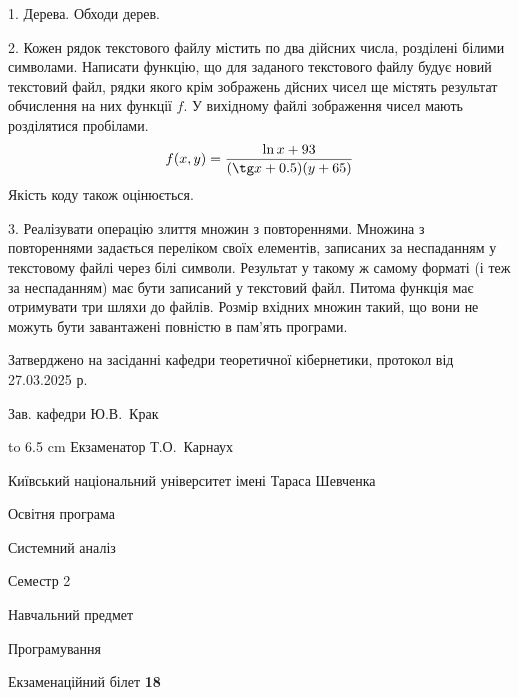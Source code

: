 \documentclass[12pt, ukrainian]{article}
\begin{document}
{%
1. Дерева. Обходи дерев.%
\par
\vspace{2mm}

2. Кожен рядок текстового файлу містить по два дійсних числа, розділені білими символами.
Написати функцію, що для заданого текстового файлу будує новий текстовий файл, рядки якого крім зображень дйсних чисел ще містять результат обчислення на них функції $f$. У вихідному файлі зображення чисел мають розділятися пробілами. 
$$f(x, y) =\frac{\ln x + 93}{(\tg x + 0.5) (y + 65)}$$ 
Якість коду також оцінюється.

\par
\vspace{2mm}

3. Реалізувати операцію злиття множин з повтореннями. Множина з повтореннями задається переліком своїх елементів, записаних за неспаданням у текстовому файлі через білі символи. Результат у такому ж самому форматі (і теж за неспаданням) має бути записаний у текстовий файл. Питома функція має отримувати три шляхи до файлів. Розмір вхідних множин такий, що вони не можуть бути завантажені повністю в пам’ять програми.

}
{\smallskip\smallskip \begin {scriptsize} Затверджено на засіданні кафедри теоретичної кібернетики, протокол   від   27.03.2025 р.\par\smallskip\smallskip\smallskip\smallskip
{\parbox {6.5 cm} {Зав. кафедри \dotfill Ю.В.~Крак}}\hspace {0.7cm} {\hbox to 6.5 cm { Екзаменатор \dotfill Т.О.~Карнаух}} \end{scriptsize}}
\vspace{2.9cm}
{{\begin {scriptsize}\par
{ \center  Київський національний університет імені Тараса Шевченка \par}
{\parbox {5 cm}{Освітня програма \hfill}{\parbox {7 cm}{Системний аналіз\hfill}}\parbox {6 cm}{\hfill Семестр 2}}\par
{\parbox {5 cm} {Навчальний предмет \hfill}\parbox {7 cm}{Програмування \hfill}\parbox {6cm}{\hfill}\par}\vspace{-15pt} \end{scriptsize}}{\center Екзаменаційний білет \No \textbf { 18 }\par}}
\end{document}
